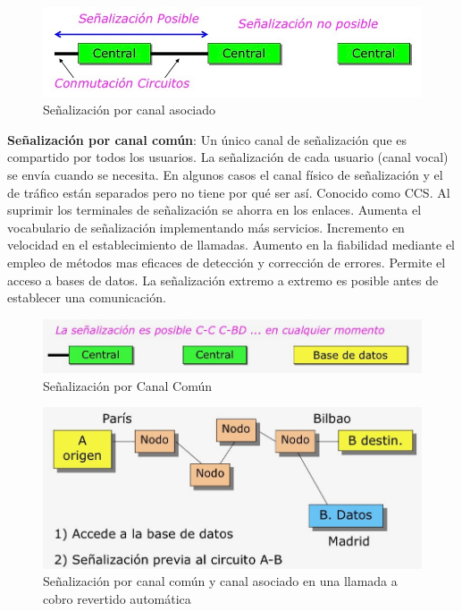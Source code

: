 \documentclass[10pt,portrait, twocolumn]{article}
\begin{document}
	\begin{figure}[!ht]
 		\centering
  		 \includegraphics[scale = 0.3]{images/SenalizacionAsociado}
		\caption{Señalización por canal asociado}
	\end{figure}

\textbf{Señalización por canal común}: Un único canal de señalización que es compartido por todos los usuarios. La señalización de cada usuario (canal vocal) se envía cuando se necesita. En algunos casos el canal físico de señalización y el de tráfico están separados pero no tiene por qué ser así. Conocido como CCS. Al suprimir los terminales de señalización se ahorra en los enlaces. Aumenta el vocabulario de señalización implementando más servicios. Incremento en velocidad en el establecimiento de llamadas. Aumento en la fiabilidad mediante el empleo de métodos mas eficaces de detección y corrección de errores. Permite el acceso a bases de datos. La señalización extremo a extremo es posible antes de establecer una comunicación.
	
	\begin{figure}[!ht]
 		\centering
  		 \includegraphics[scale = 0.3]{images/SenalizacionComun}
		\caption{Señalización por Canal Común}
	\end{figure}

	\begin{figure}[!ht]
 		\centering
  		 \includegraphics[scale = 0.3]{images/CobroRevertido}
		\caption{Señalización por canal común y canal asociado en una llamada a cobro revertido automática}
	\end{figure}
\end{document}
